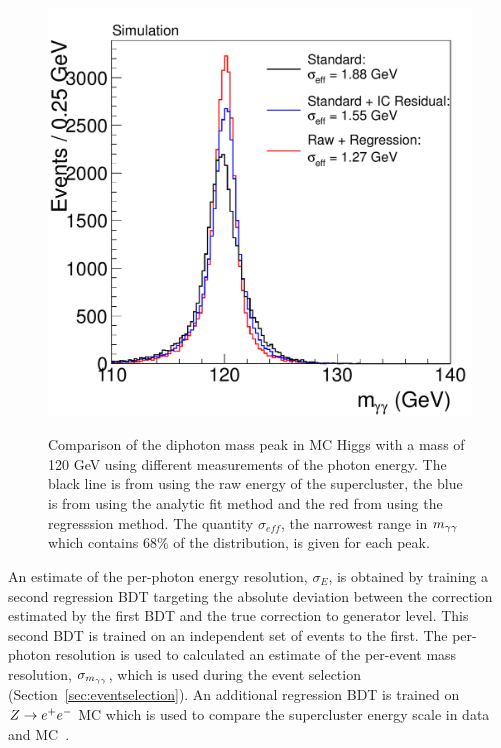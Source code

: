 \begin{figure}
\begin{center}
\includegraphics[width=.6\textwidth]{hgg7TeV/generalPlots/regrresall.pdf}
\label{fig:mcregrcomparison}
\caption{Comparison of the diphoton mass peak in MC Higgs with a mass of 120 GeV using different 
measurements of the photon energy. The black line 
is from using the raw energy of the supercluster, the blue is from using the analytic fit method 
and the red from using the regresssion method. The quantity $\sigma_{eff}$,
the narrowest range in $m_{\gamma\gamma}$ which contains 68\% of the distribution, is given for each peak.}
\end{center}
\end{figure}

An estimate of the per-photon energy resolution, $\sigma_{E}$, is obtained by training a second 
regression BDT targeting the absolute deviation between the correction estimated by the 
first BDT and the true correction to generator level. This second BDT is trained on an independent
set of events to the first. The per-photon resolution is used to calculated an estimate of the 
per-event mass resolution, $\sigma_{m_{\gamma\gamma}}$, which is used during the event selection 
(Section~\ref{sec:eventselection}). An additional regression BDT is trained on $Z\rightarrow e^{+}e^{-}$ MC which is used
to compare the supercluster energy scale in data and MC~\cite{AN-12-048}.

